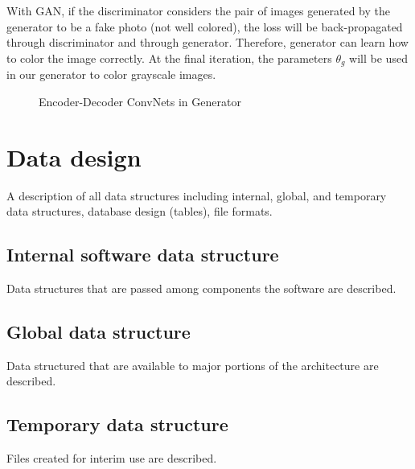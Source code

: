 \documentclass[oneside,a4paper,12pt]{report}
\begin{document}
	With GAN, if the discriminator considers the pair of images generated by the generator to be a fake photo (not well colored), the loss will be back-propagated through discriminator and through generator. Therefore, generator can learn how to color the image correctly. At the final iteration, the parameters $\theta_g$ will be used in our generator to color grayscale images.

  \begin{center}
	\begin{figure}[!htbp]
		\centering
	  \caption{Encoder-Decoder ConvNets in Generator}
	  \label{fig:gen_color-dig}
	\end{figure}
\end{center}


\section{Data design }
A description of all data structures including internal, global, and temporary data structures, database design (tables), file formats.
\subsection{Internal software data structure}
Data structures that are passed among components the software are described.
\subsection{Global data structure}
Data structured that are available to major portions of the architecture are described.
\subsection{Temporary data structure}
Files created for interim use are described.
\end{document}
